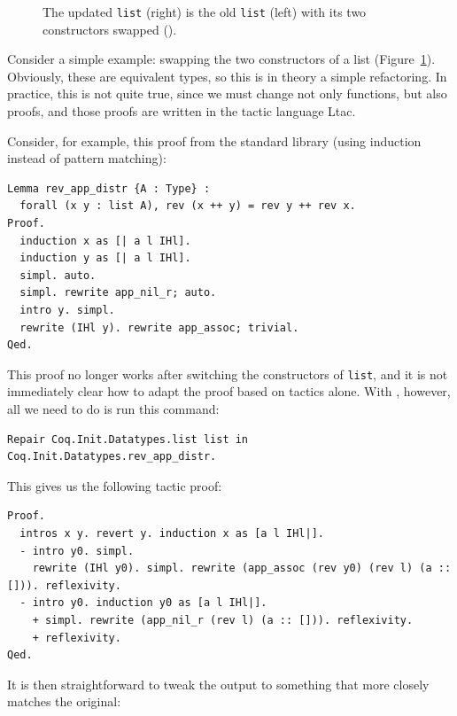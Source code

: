 \begin{figure}
\begin{minipage}{0.46\textwidth}
   
\end{minipage}
\hfill
\begin{minipage}{0.46\textwidth}
   
\end{minipage}
\caption{The updated \lstinline{list} (right) is the old \lstinline{list} (left) with its two constructors swapped ().}
\label{fig:listswap}
\end{figure}

Consider a simple example: swapping the two constructors of a list (Figure~\ref{fig:listswap}).
Obviously, these are equivalent types, so this is in theory a simple refactoring.
In practice, this is not quite true, since we must change not only functions, but also proofs,
and those proofs are written in the tactic language Ltac.

Consider, for example, this proof from the standard library (using induction instead of pattern matching): %

\begin{lstlisting}
Lemma rev_app_distr {A : Type} :
  forall (x y : list A), rev (x ++ y) = rev y ++ rev x.
Proof.
  induction x as [| a l IHl].
  induction y as [| a l IHl].
  simpl. auto.
  simpl. rewrite app_nil_r; auto.
  intro y. simpl.
  rewrite (IHl y). rewrite app_assoc; trivial.
Qed.
\end{lstlisting}
This proof no longer works after switching the constructors of \lstinline{list},
and it is not immediately clear how to adapt the proof based on tactics alone.
With \toolname, however, all we need to do is run this command: %

\begin{lstlisting}
Repair Coq.Init.Datatypes.list list in Coq.Init.Datatypes.rev_app_distr.
\end{lstlisting}
This gives us the following tactic proof:

\begin{lstlisting}
Proof.
  intros x y. revert y. induction x as [a l IHl|].
  - intro y0. simpl.
    rewrite (IHl y0). simpl. rewrite (app_assoc (rev y0) (rev l) (a :: [])). reflexivity.
  - intro y0. induction y0 as [a l IHl|].
    + simpl. rewrite (app_nil_r (rev l) (a :: [])). reflexivity.
    + reflexivity.
Qed.
\end{lstlisting}
It is then straightforward to tweak the output to something
that more closely matches the original:

